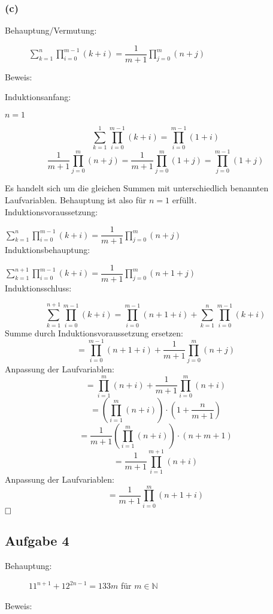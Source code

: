 \documentclass[11pt, a4paper]{article}
\begin{document}
	\subsubsection*{(c)}

		\begin{description}
			\item[Behauptung/Vermutung:] $\sum_{k=1}^n \prod_{i=0}^{m-1}(k+i) = \dfrac{1}{m+1} \prod_{j=0}^m (n+j)$
			\item[Beweis:]
		\end{description}

		Induktionsanfang: 

		$n=1$

		\[ \sum_{k=1}^1 \prod_{i=0}^{m-1}(k+i) = \prod_{i=0}^{m-1}(1+i) \]
		\[ \dfrac{1}{m+1} \prod_{j=0}^m (n+j) = \dfrac{1}{m+1} \prod_{j=0}^m (1+j) = \prod_{j=0}^{m-1} (1+j) \]

		Es handelt sich um die gleichen Summen mit unterschiedlich benannten Laufvariablen. Behauptung ist also für $n=1$ erfüllt. \\


		Induktionsvoraussetzung:

		$\sum_{k=1}^n \prod_{i=0}^{m-1}(k+i) = \dfrac{1}{m+1} \prod_{j=0}^m (n+j)$ \\


		Induktionsbehauptung:

		$\sum_{k=1}^{n+1} \prod_{i=0}^{m-1}(k+i) = \dfrac{1}{m+1} \prod_{j=0}^m (n+1+j)$ \\


		Induktionsschluss:

		\[ \sum_{k=1}^{n+1} \prod_{i=0}^{m-1}(k+i) = \prod_{i=0}^{m-1}(n+1+i) + \sum_{k=1}^{n} \prod_{i=0}^{m-1}(k+i) \]
		Summe durch Induktionsvoraussetzung ersetzen:
		\[ = \prod_{i=0}^{m-1}(n+1+i) + \dfrac{1}{m+1} \prod_{j=0}^m (n+j)\]
		Anpassung der Laufvariablen:
		\[ = \prod_{i=1}^{m}(n+i) + \dfrac{1}{m+1} \prod_{i=0}^m (n+i) \]
		\[ = \left(\prod_{i=1}^{m}(n+i) \right) \cdot \left( 1 + \dfrac{n}{m+1} \right) \] 
		\[ = \dfrac{1}{m+1} \left( \prod_{i=1}^m(n+i) \right) \cdot (n+m+1) \]
		\[ = \dfrac{1}{m+1} \prod_{i=1}^{m+1} (n+i) \]
		Anpassung der Laufvariablen: 
		\[ = \dfrac{1}{m+1} \prod_{i=0}^{m} (n+1+i) \]$\hfill \Box$



	\subsection*{Aufgabe 4}


		\begin{description}
			\item[Behauptung:] $11^{n+1} + 12^{2n-1} = 133m$ für $m \in \mathbb{N}$
			\item[Beweis:]
		\end{description}
\end{document}
